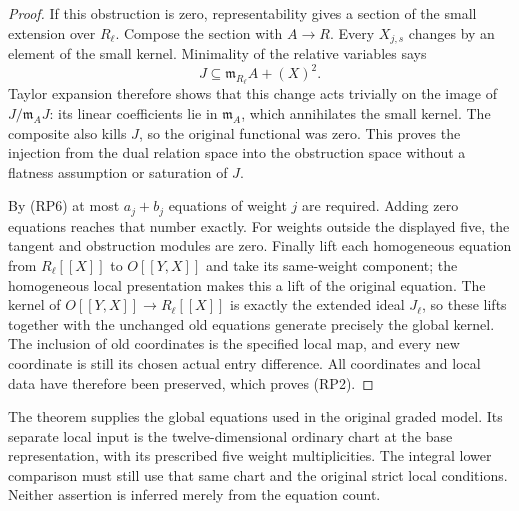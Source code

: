 \begin{proof}
If this obstruction is zero, representability gives a section of
the small extension over $R_\ell$.  Compose the section with
$A\to R$.  Every $X_{j,s}$ changes by an element of the small kernel.
Minimality of the relative variables says
\[
                 J\subseteq\mathfrak m_{R_\ell}A+(X)^2.
\]
Taylor expansion therefore shows that this change acts trivially on
the image of $J/\mathfrak m_AJ$: its linear coefficients lie in
$\mathfrak m_A$, which annihilates the small kernel.  The composite
also kills $J$, so the original functional was zero.  This proves
the injection from the dual relation space into the obstruction
space without a flatness assumption or saturation of $J$.

By (RP6) at most $a_j+b_j$ equations of weight $j$ are required.
Adding zero equations reaches that number exactly.  For weights
outside the displayed five, the tangent and obstruction modules
are zero.  Finally lift each homogeneous equation from
$R_\ell[[X]]$ to $O[[Y,X]]$ and take its same-weight component;
the homogeneous local presentation makes this a lift of the original
equation.  The kernel of $O[[Y,X]]\to R_\ell[[X]]$ is exactly
the extended ideal $J_\ell$, so these lifts together with the unchanged
old equations generate precisely the global kernel.  The inclusion
of old coordinates is the specified local map, and every new
coordinate is still its chosen actual entry difference.
All coordinates and local data have therefore been preserved,
which proves (RP2).
\end{proof}

The theorem supplies the global equations used in the original graded
model.  Its separate local input is the twelve-dimensional ordinary
chart at the base representation, with its prescribed five weight
multiplicities.  The integral lower comparison must still use that
same chart and the original strict local conditions.  Neither assertion
is inferred merely from the equation count.
